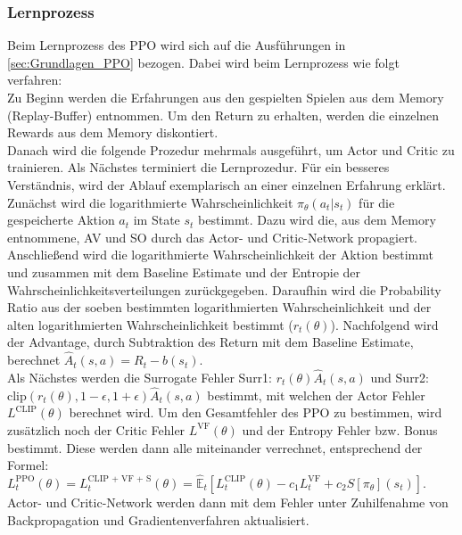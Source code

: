 \subsubsection{Lernprozess} \label{subsubsec:Konzept_Lernprozess_PPO}
Beim Lernprozess des PPO wird sich auf die Ausführungen in \autoref{sec:Grundlagen_PPO} bezogen. Dabei wird beim Lernprozess wie folgt verfahren:\\
Zu Beginn werden die Erfahrungen aus den gespielten Spielen aus dem Memory (Replay-Buffer) entnommen.
Um den Return zu erhalten, werden die einzelnen Rewards aus dem Memory diskontiert.\\
Danach wird die folgende Prozedur mehrmals ausgeführt, um Actor und Critic zu trainieren. Als Nächstes terminiert die Lernprozedur.
Für ein besseres Verständnis, wird der Ablauf exemplarisch an einer einzelnen Erfahrung erklärt.\\
Zunächst wird die logarithmierte Wahrscheinlichkeit $\pi_{\theta}(a_{t}|s_{t})$ für die gespeicherte Aktion $a_t$ im State $s_t$ bestimmt. Dazu wird die, aus dem Memory entnommene, AV und SO durch das Actor- und Critic-Network propagiert. Anschließend wird die logarithmierte Wahrscheinlichkeit der Aktion bestimmt und zusammen mit dem Baseline Estimate und der Entropie der Wahrscheinlichkeitsverteilungen zurückgegeben.
Daraufhin wird die Probability Ratio aus der soeben bestimmten logarithmierten Wahrscheinlichkeit und der alten logarithmierten Wahrscheinlichkeit bestimmt ($r_{t}(\theta)$).
Nachfolgend wird der Advantage, durch Subtraktion des Return mit dem Baseline Estimate, berechnet $\hat{A}_{t}(s, a) = R_{t} - b(s_{t})$.\\
Als Nächstes werden die Surrogate Fehler Surr1: $r_{t}(\theta) \hat{A}_{t}(s, a)$ und 
Surr2: $\text{clip}(r_{t}(\theta), 1 - \epsilon, 1 + \epsilon) \hat{A}_{t}(s, a)$ bestimmt, mit welchen der Actor Fehler $L^\text{CLIP} (\theta)$ berechnet wird.
Um den Gesamtfehler des PPO zu bestimmen, wird zusätzlich noch der Critic Fehler $L^{\text{VF}} (\theta)$ und der Entropy Fehler bzw. Bonus bestimmt. Diese werden dann alle miteinander verrechnet, entsprechend der Formel:\\
$L^\text{PPO}_{t} (\theta) = L^\text{CLIP + VF + S}_{t} (\theta) = \mathbb{\hat{E}}_{t} [L^{\text{CLIP}}_{t}(\theta) - c_{1}L^{\text{VF}}_{t} + c_{2}S[\pi_{\theta}](s_{t})]$.\\
Actor- und Critic-Network werden dann mit dem Fehler unter Zuhilfenahme von Backpropagation und Gradientenverfahren aktualisiert.

